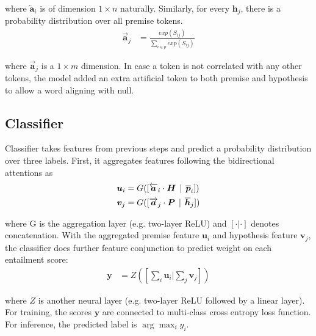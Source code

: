 \documentclass[review,journal]{vgtc}         %
\newcommand{\taoli}[1]{\textcolor{orange}{[#1]}}
\begin{document}
where $\overleftarrow{\boldsymbol{a}}_i$ is of dimension $1 \times n$ naturally. Similarly, for every $\boldsymbol{h}_j$, there is a probability distribution over all premise tokens.
\begin{align}
  \overrightarrow{\boldsymbol{a}}_j &= \frac{exp(S_{ij})}{\sum_{i \in p} exp(S_{ij})} \label{eq:aright}
\end{align}

where $\overrightarrow{\boldsymbol{a}}_j$ is a $1 \times m$ dimension. In case a token is not correlated with any other tokens, the model added an extra artificial token to both premise and hypothesis to allow a word aligning with null.

\subsection{Classifier} \label{sec:cls}
Classifier takes features from previous steps and predict a probability distribution over three labels. First, it aggregates features following the bidirectional attentions as
\begin{align}
  \boldsymbol{u}_i &= G([\overleftarrow{\boldsymbol{a}}_i \cdot \boldsymbol{H} \hspace{1ex} | \hspace{1ex}  \overline{\boldsymbol{p}}_i]) \\
  \boldsymbol{v}_j &= G([\overrightarrow{\boldsymbol{a}}_j \cdot \boldsymbol{P} \hspace{1ex}  | \hspace{1ex}  \overline{\boldsymbol{h}}_j])
\end{align}

where G is the aggregation layer (e.g. two-layer ReLU) and $[\cdot|\cdot]$ denotes concatenation. With the aggregated premise feature $\boldsymbol{u}_i$ and hypothesis feature $\boldsymbol{v}_j$, the classifier does further feature conjunction to predict weight on each entailment score:
\begin{align}
  \boldsymbol{y} &= Z([\sum_i \boldsymbol{u}_i | \sum_j \boldsymbol{v}_j]) \label{eq:yscore}
\end{align}

where $Z$ is another neural layer (e.g. two-layer ReLU followed by a linear layer). For training, the scores $\boldsymbol{y}$ are connected to multi-class cross entropy loss function. For inference, the predicted label is $\arg\max_i y_i$.

\end{document}
